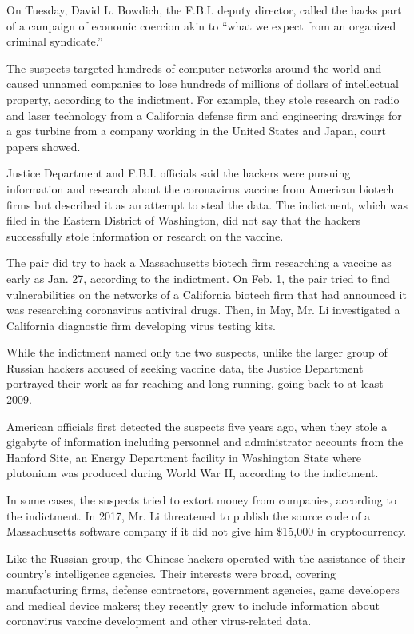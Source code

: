 On Tuesday, David L. Bowdich, the F.B.I. deputy director, called the
hacks part of a campaign of economic coercion akin to ``what we expect
from an organized criminal syndicate.''

The suspects targeted hundreds of computer networks around the world and
caused unnamed companies to lose hundreds of millions of dollars of
intellectual property, according to the indictment. For example, they
stole research on radio and laser technology from a California defense
firm and engineering drawings for a gas turbine from a company working
in the United States and Japan, court papers showed.

Justice Department and F.B.I. officials said the hackers were pursuing
information and research about the coronavirus vaccine from American
biotech firms but described it as an attempt to steal the data. The
indictment, which was filed in the Eastern District of Washington, did
not say that the hackers successfully stole information or research on
the vaccine.

The pair did try to hack a Massachusetts biotech firm researching a
vaccine as early as Jan. 27, according to the indictment. On Feb. 1, the
pair tried to find vulnerabilities on the networks of a California
biotech firm that had announced it was researching coronavirus antiviral
drugs. Then, in May, Mr. Li investigated a California diagnostic firm
developing virus testing kits.

While the indictment named only the two suspects, unlike the larger
group of Russian hackers accused of seeking vaccine data, the Justice
Department portrayed their work as far-reaching and long-running, going
back to at least 2009.

American officials first detected the suspects five years ago, when they
stole a gigabyte of information including personnel and administrator
accounts from the Hanford Site, an Energy Department facility in
Washington State where plutonium was produced during World War II,
according to the indictment.

In some cases, the suspects tried to extort money from companies,
according to the indictment. In 2017, Mr. Li threatened to publish the
source code of a Massachusetts software company if it did not give him
\$15,000 in cryptocurrency.

Like the Russian group, the Chinese hackers operated with the assistance
of their country's intelligence agencies. Their interests were broad,
covering manufacturing firms, defense contractors, government agencies,
game developers and medical device makers; they recently grew to include
information about coronavirus vaccine development and other
virus-related data.

